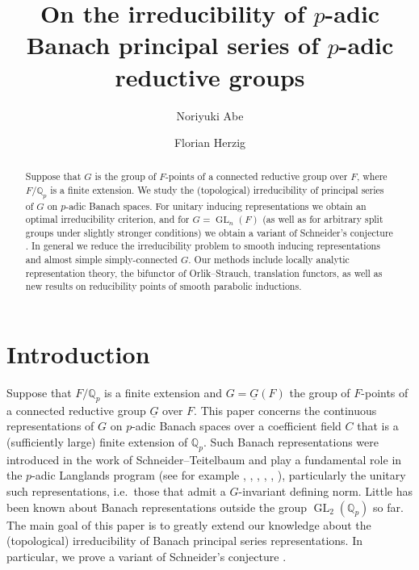 \documentclass[a4paper]{amsart}
\title[On the irreducibility of $p$-adic Banach principal series]{On the irreducibility of $p$-adic Banach principal series of $p$-adic reductive groups}
\author{Noriyuki Abe}
\author{Florian Herzig}
\numberwithin{equation}{section}
\theoremstyle{remark}
\theoremstyle{definition}
\newcommand{\Q}{\mathbb{Q}}
\DeclareMathOperator{\GL}{GL}
\newcommand{\alggrp}[1]{\underline{#1}}
\begin{document}
\begin{abstract}
  Suppose that $G$ is the group of $F$-points of a connected reductive group over $F$, where $F/\Q_p$ is a finite extension.
  We study the (topological) irreducibility of principal series of $G$ on $p$-adic Banach spaces.
  For unitary inducing representations we obtain an optimal irreducibility criterion, and for $G = \GL_n(F)$ (as well as for arbitrary split groups under slightly stronger conditions) we obtain a variant of Schneider's conjecture \cite[Conjecture 2.5]{MR2275644}.
  In general we reduce the irreducibility problem to smooth inducing representations and almost simple simply-connected $G$.
  Our methods include locally analytic representation theory, the bifunctor of Orlik--Strauch, translation functors, as well as new results on reducibility points of smooth parabolic inductions.
\end{abstract}

\maketitle

\tableofcontents

\section{Introduction}
\label{sec:introduction}

Suppose that $F/\Q_p$ is a finite extension and $G = \alggrp G(F)$ the group of $F$-points of a connected reductive group $\alggrp G$ over $F$.
This paper concerns the continuous representations of $G$ on $p$-adic Banach spaces over a coefficient field $C$ that is a (sufficiently large) finite extension of $\Q_p$.
Such Banach representations were introduced in the work of Schneider--Teitelbaum \cite{MR1900706} and play a fundamental role in the $p$-adic Langlands program (see for example \cite{MR2097893}, \cite{MR2359853}, \cite{Colmez}, \cite{emerton-local-global}, \cite{MR3150248}, \cite{MR3529394}), particularly the unitary such representations, i.e.\ those that admit a $G$-invariant defining norm.
Little has been known about Banach representations outside the group $\GL_2(\Q_p)$ so far.
The main goal of this paper is to greatly extend our knowledge about the (topological) irreducibility of Banach principal series representations.
In particular, we prove a variant of Schneider's conjecture \cite[Conjecture 2.5]{MR2275644}.
\end{document}
